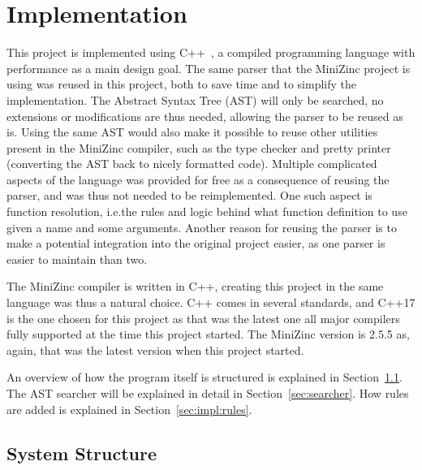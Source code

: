 \documentclass[a4paper,12pt]{article}
\begin{document}
\section{Implementation}\label{sec:impl}
This project is implemented using C++~\cite{cpp}, a compiled programming language with
performance as a main design goal. The same parser that the MiniZinc project is
using was reused in this project, both to save time and to simplify the implementation.
The Abstract Syntax Tree (AST) will only be searched, no extensions or
modifications are thus needed, allowing the parser to be reused as is.
Using the same AST would also make it possible to reuse other utilities
present in the MiniZinc compiler, such as the type checker and pretty printer (converting
the AST back to nicely formatted code). Multiple complicated aspects of the language was
provided for free as a consequence of reusing the parser, and was thus not needed to be
reimplemented. One such aspect is function
resolution, i.e.\@ the rules and logic behind what function definition to use given a name
and some arguments. Another reason
for reusing the parser is to make a potential integration into the original project easier,
as one parser is easier to maintain than two.

The MiniZinc
compiler is written in C++, creating this project in the
same language was thus a natural choice. C++ comes in several standards, and C++17 is the one
chosen for this project as that was the latest one all major compilers fully supported at
the time this project started. The MiniZinc version is 2.5.5 as, again, that was the
latest version when this project started.

An overview of how the program itself is structured is explained in
Section~\ref{sec:impl:structure}. The AST searcher will be explained in detail in
Section~\ref{sec:searcher}. How rules are added is explained in Section~\ref{sec:impl:rules}.

\subsection{System Structure}\label{sec:impl:structure}

\end{document}
